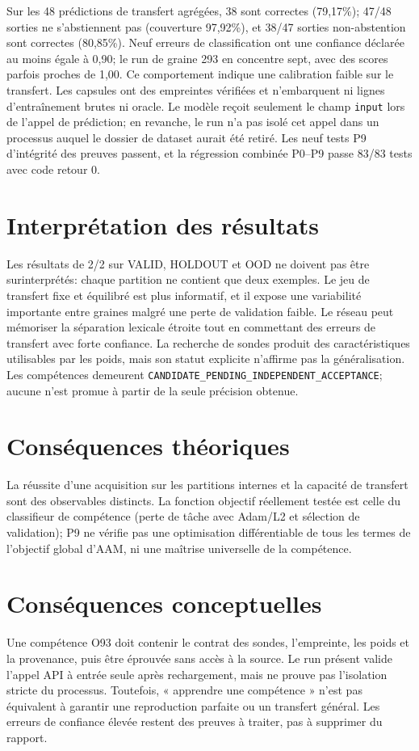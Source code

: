 \documentclass[11pt,a4paper,oneside]{report}
\begin{document}
Sur les 48 prédictions de transfert agrégées, 38 sont correctes (79,17\%); 47/48 sorties ne s'abstiennent pas (couverture 97,92\%), et 38/47 sorties non-abstention sont correctes (80,85\%). Neuf erreurs de classification ont une confiance déclarée au moins égale à 0,90; le run de graine 293 en concentre sept, avec des scores parfois proches de 1,00. Ce comportement indique une calibration faible sur le transfert. Les capsules ont des empreintes vérifiées et n’embarquent ni lignes d’entraînement brutes ni oracle. Le modèle reçoit seulement le champ \texttt{input} lors de l’appel de prédiction; en revanche, le run n’a pas isolé cet appel dans un processus auquel le dossier de dataset aurait été retiré. Les neuf tests P9 d'intégrité des preuves passent, et la régression combinée P0--P9 passe 83/83 tests avec code retour 0.

\section{Interprétation des résultats}
Les résultats de 2/2 sur VALID, HOLDOUT et OOD ne doivent pas être surinterprétés: chaque partition ne contient que deux exemples. Le jeu de transfert fixe et équilibré est plus informatif, et il expose une variabilité importante entre graines malgré une perte de validation faible. Le réseau peut mémoriser la séparation lexicale étroite tout en commettant des erreurs de transfert avec forte confiance. La recherche de sondes produit des caractéristiques utilisables par les poids, mais son statut explicite n'affirme pas la généralisation. Les compétences demeurent \texttt{CANDIDATE\_\allowbreak PENDING\_\allowbreak INDEPENDENT\_\allowbreak ACCEPTANCE}; aucune n'est promue à partir de la seule précision obtenue.

\section{Conséquences théoriques}
La réussite d'une acquisition sur les partitions internes et la capacité de transfert sont des observables distincts. La fonction objectif réellement testée est celle du classifieur de compétence (perte de tâche avec Adam/L2 et sélection de validation); P9 ne vérifie pas une optimisation différentiable de tous les termes de l'objectif global d'AAM, ni une maîtrise universelle de la compétence.

\section{Conséquences conceptuelles}
Une compétence O93 doit contenir le contrat des sondes, l'empreinte, les poids et la provenance, puis être éprouvée sans accès à la source. Le run présent valide l’appel API à entrée seule après rechargement, mais ne prouve pas l’isolation stricte du processus. Toutefois, « apprendre une compétence » n'est pas équivalent à garantir une reproduction parfaite ou un transfert général. Les erreurs de confiance élevée restent des preuves à traiter, pas à supprimer du rapport.
\end{document}
